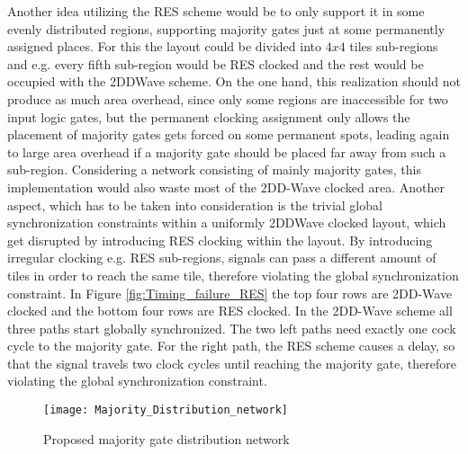 Another idea utilizing the RES scheme would be to only support it in some evenly distributed regions, supporting majority gates just at some permanently assigned places. For this the layout could be divided into $4x4$ tiles sub-regions and e.g. every fifth sub-region would be RES clocked and the rest would be occupied with the 2DDWave scheme. On the one hand, this realization should not produce as much area overhead, since only some regions are inaccessible for two input logic gates, but the permanent clocking assignment only allows the placement of majority gates gets forced on some permanent spots, leading again to large area overhead if a majority gate should be placed far away from such a sub-region. Considering a network consisting of mainly majority gates, this implementation would also waste most of the 2DD-Wave clocked area. Another aspect, which has to be taken into consideration is the trivial global synchronization constraints within a uniformly 2DDWave clocked layout, which get disrupted by introducing RES clocking within the layout. By introducing irregular clocking e.g. RES sub-regions, signals can pass a different amount of tiles in order to reach the same tile, therefore violating the global synchronization constraint. In Figure \ref{fig:Timing_failure_RES} the top four rows are 2DD-Wave clocked and the bottom four rows are RES clocked. In the 2DD-Wave scheme all three paths start globally synchronized. The two left paths need exactly one cock cycle to the majority gate. For the right path, the RES scheme causes a delay, so that the signal travels two clock cycles until reaching the majority gate, therefore violating the global synchronization constraint.


\begin{figure}
	\centering
	\texttt{[image: Majority\_Distribution\_network]}
	\caption{Proposed majority gate distribution network}\label{fig:QCA_Maj_nw}
\end{figure}


